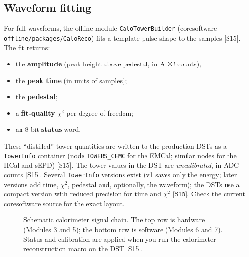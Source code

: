 \documentclass[11pt,letterpaper]{article}
\newcommand{\code}[1]{\texttt{#1}}
\begin{document}
\subsection{Waveform fitting}
For full waveforms, the offline module \code{CaloTowerBuilder} (coresoftware \code{offline/packages/CaloReco}) fits a template pulse shape to the samples [S15].
The fit returns:
\begin{itemize}
\item the \textbf{amplitude} (peak height above pedestal, in ADC counts);
\item the \textbf{peak time} (in units of samples);
\item the \textbf{pedestal};
\item a \textbf{fit-quality} $\chi^2$ per degree of freedom;
\item an 8-bit \textbf{status} word.
\end{itemize}
These ``distilled'' tower quantities are written to the production DSTs as a \code{TowerInfo} container (node \code{TOWERS\_CEMC} for the EMCal; similar nodes for the HCal and sEPD) [S15].
The tower values in the DST are \emph{uncalibrated}, in ADC counts [S15].
Several \code{TowerInfo} versions exist (v1 saves only the energy; later versions add time, $\chi^2$, pedestal and, optionally, the waveform); the DSTs use a compact version with reduced precision for time and $\chi^2$ [S15]. Check the current coresoftware source for the exact layout.

\begin{figure}[h]\centering
{}
\caption{Schematic calorimeter signal chain. The top row is hardware (Modules 3 and 5); the bottom row is software (Modules 6 and 7). Status and calibration are applied when you run the calorimeter reconstruction macro on the DST [S15].}\label{fig:chain}
\end{figure}
\end{document}
